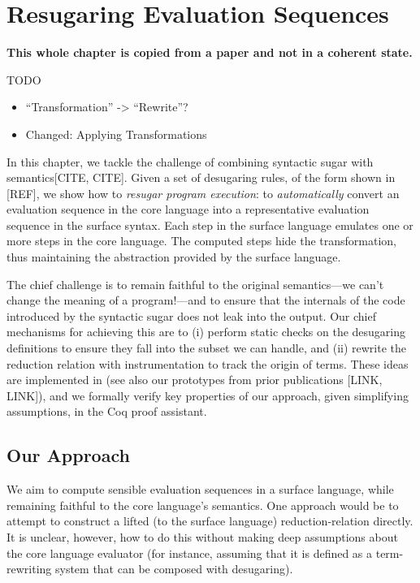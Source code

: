 \chapter{Resugaring Evaluation Sequences}\label{chap:resugar-eval}

\textbf{This whole chapter is copied from a paper and not in a coherent state.}

TODO
\begin{itemize}
\item ``Transformation'' -> ``Rewrite''?
\item Changed: Applying Transformations
\end{itemize}


In this chapter, we tackle the challenge of combining syntactic sugar
with semantics[CITE, CITE]. Given a set of desugaring rules, of the
form shown in [REF], we show how to \emph{resugar program execution}:
to \emph{automatically} convert an evaluation sequence in the core
language into a representative evaluation sequence in the surface
syntax. Each step in the surface language emulates one or more steps
in the core language. The computed steps hide the transformation, thus
maintaining the abstraction provided by the surface language.

The chief challenge is to remain faithful to the original
semantics---we can't change the meaning of a program!---and to ensure
that the internals of the code introduced by the syntactic sugar does
not leak into the output. Our chief mechanisms for achieving this are
to (i) perform static checks on the desugaring definitions to ensure
they fall into the subset we can handle, and (ii) rewrite the
reduction relation with instrumentation to track the origin of terms.
These ideas are implemented in \Tool [LINK] (see also our prototypes from
prior publications [LINK, LINK]), and we formally verify key properties
of our approach, given simplifying assumptions, in the Coq proof
assistant.


\section{Our Approach}

We aim to compute sensible evaluation sequences in a surface language,
while remaining faithful to the core language's semantics.  One approach
would be to attempt to construct a lifted (to the surface language)
reduction-relation directly. It is unclear, however, how to do this
without making deep assumptions about the core language evaluator
(for instance, assuming that it is defined as a term-rewriting system that can be composed
with desugaring).

